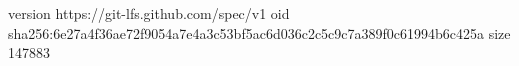 version https://git-lfs.github.com/spec/v1
oid sha256:6e27a4f36ae72f9054a7e4a3c53bf5ac6d036c2c5c9c7a389f0c61994b6c425a
size 147883
